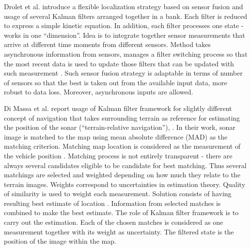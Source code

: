 Drolet et al. \cite{drolet00} introduce a flexible localization strategy based on sensor fusion and usage of several Kalman filters arranged together in a bank. Each filter is reduced to express a simple kinetic equation. In addition, each filter processes one state - works in one ``dimension''. Idea is to integrate together sensor measurements that arrive at different time moments from different sensors. Method takes asynchronous information from sensors, manages a filter switching process so that the most recent data is used to update those filters that can be updated with such measurement \cite{drolet00}. Such sensor fusion strategy is adaptable in terms of number of sensors so that the best is taken out from the available input data, more robust to data loss. Moreover, asynchronous inputs are allowed. 

Di Massa et al. report usage of Kalman filter framework for slightly different concept of navigation that takes surrounding terrain as reference for estimating the position of the sonar (``terrain-relative navigation''), \cite{diMassa97}. In their work, sonar image is matched to the map using mean absolute difference (MAD) as the matching criterion. Matching map location is considered as the measurement of the vehicle position \cite{diMassa97}. Matching process is not entirely transparent - there are always several candidates eligible to be candidate for best matching. Thus several matchings are selected and weighted depending on how much they relate to the terrain images. Weights correspond to uncertainties in estimation theory. Quality of similarity is used to weight each measurement. Solution consists of having resulting best estimate of location \cite{diMassa97}. Information from selected matches is combined to make the best estimate. The role of Kalman filter framework is to carry out the estimation. Each of the chosen matches is considered as one measurement together with its weight as uncertainty. The filtered state is the position of the image within the map. 

